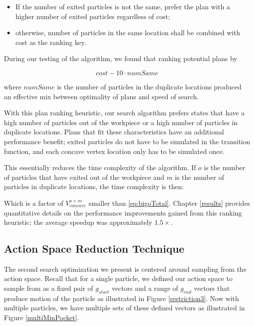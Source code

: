 \begin{itemize}
\item If the number of exited particles is not the same, prefer the plan with a higher number of exited particles regardless of cost;
\item otherwise, number of particles in the same location shall be combined with cost as the ranking key.
\end{itemize}

During our testing of the algorithm, we found that ranking potential plans by

$$
cost - 10 \cdot numSame
$$

where $numSame$ is the number of particles in the duplicate locations produced an effective mix between optimality of plans and speed of search.

With this plan ranking heuristic, our search algorithm prefers states that have a high number of particles out of the workpiece or a high number of particles in duplicate locations. Plans that fit these characteristics have an additional performance benefit; exited particles do not have to be simulated in the transition function, and each concave vertex location only has to be simulated once.

This essentially reduces the time complexity of the algorithm. If $o$ is the number of particles that have exited out of the workpiece and $m$ is the number of particles in duplicate locations, the time complexity is then:

 {
  \label{eq:bigoTotalWithHeuristic}
}

Which is a factor of $V_{concave}^{o + m}$ smaller than \eqref{eq:bigoTotal}. Chapter \ref{results} provides quantitative details on the performance improvements gained from this ranking heuristic; the average speedup was approximately $1.5 \times$.

\subsection{Action Space Reduction Technique}

The second search optimization we present is centered around sampling from the action space. Recall that for a single particle, we defined our action space to sample from as a fixed pair of $g_{start}$ vectors and a range of $g_{end}$ vectors that produce motion of the particle as illustrated in Figure \ref{restriction3}. Now with multiple particles, we have multiple sets of these defined vectors as illustrated in Figure \ref{multiMinPocket}.

